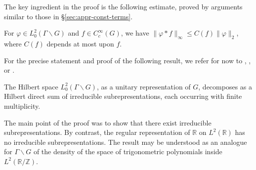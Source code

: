 \documentclass[reqno]{amsart} 
\begin{document}
The key ingredient in the proof is the following estimate, proved by arguments similar to those in \S\ref{sec:appr-const-terms}.
\begin{theorem}
  For $\varphi \in L^2_0(\Gamma \backslash G)$ and $f \in C _c ^\infty (G)$, we have $\|\varphi \ast f\| _\infty \leq C (f) \|\varphi \| _2 $, where $C(f)$ depends at most upon $f$.
\end{theorem}

For the precise statement and proof of the following result, we refer for now to \cite[Thm 16.2]{MR1482800}, \cite[\S9]{MR2331343}, or \cite[\S1.6]{MR3468638}.

\begin{theorem}
  The Hilbert space $L^2_0(\Gamma \backslash G)$, as a unitary representation of $G$, decomposes as a Hilbert direct sum of irreducible subrepresentations, each occurring with finite multiplicity.
\end{theorem}
The main point of the proof was to show that there exist irreducible subrepresentations.  By contrast, the regular representation of $\mathbb{R}$ on $L^2(\mathbb{R})$ has no irreducible subrepresentations.  The result may be understood as an analogue for $\Gamma \backslash G$ of the density of the space of trigonometric polynomials inside $L^2(\mathbb{R}/\mathbb{Z})$.


{} 
\end{document}
